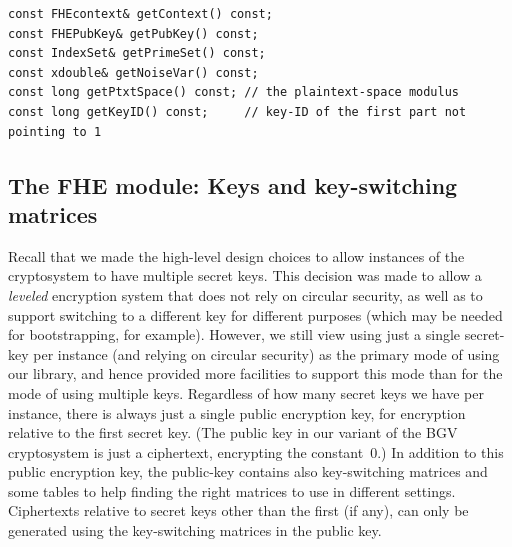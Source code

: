 \documentclass[14pt]{extarticle}
\def\FHE{\textsf{FHE}}
\begin{document}
\vspace{-2ex}
\begin{verbatim}
const FHEcontext& getContext() const;
const FHEPubKey& getPubKey() const;
const IndexSet& getPrimeSet() const;
const xdouble& getNoiseVar() const;
const long getPtxtSpace() const; // the plaintext-space modulus
const long getKeyID() const;     // key-ID of the first part not pointing to 1
\end{verbatim}


\subsection{The {\FHE} module: Keys and key-switching matrices}
\label{sec:FHE}
Recall that we made the high-level design choices to allow  instances
of the cryptosystem to have multiple secret keys. This decision was
made to allow a \emph{leveled} encryption system that does not rely on
circular security, as well as to support switching to a different key
for different purposes (which may be needed for bootstrapping, for
example). However, we still view using just a single secret-key per
instance (and relying on circular security) as the primary mode of
using our library, and hence provided more facilities to support this
mode than for the mode of using multiple keys.  Regardless of how many
secret keys we have per instance, there is always just a single public
encryption key, for encryption relative to the first secret key.
(The public key in our variant of the BGV cryptosystem is just a
ciphertext, encrypting the constant~0.) In addition to this public
encryption key, the public-key contains also key-switching matrices
and some tables to help finding the right matrices to use in different
settings. Ciphertexts relative to secret keys other than the first (if
any), can only be generated using the key-switching matrices in the
public key. 

\end{document}
